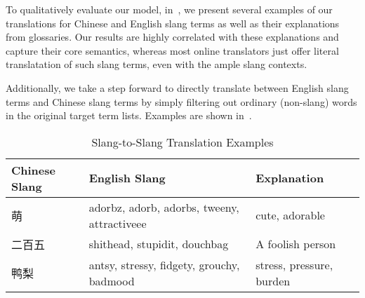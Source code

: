 To qualitatively evaluate our model, in~, 
we present several examples of our translations for Chinese and English slang 
terms as well as their explanations from glossaries.
Our results are highly correlated with these explanations and 
capture their core semantics, whereas most online translators just offer 
literal translatation of such slang terms, even with the ample
slang contexts.

Additionally, we take a step forward to directly translate between 
English slang terms and Chinese slang terms by simply filtering out 
ordinary (non-slang) words in the original target term lists. 
Examples are shown in~. 
\begin{table}[t]
	\scriptsize
	\centering
	\caption{\small{Slang-to-Slang Translation Examples}\vspace{-10pt}}
	\begin{tabular}{C{1.92cm} C{2.5cm} C{2.0cm}}
		\textbf{Chinese Slang} & \textbf{English Slang} & \textbf{Explanation} \\ \hline
		萌 & adorbz, adorb, adorbs, tweeny, attractiveee & cute, adorable \\ \hline
		二百五 & shithead, stupidit, douchbag & A foolish person\\ \hline
		鸭梨 & antsy, stressy, fidgety, grouchy, badmood & stress, pressure, burden \\ \hline
	\end{tabular}
	\label{tab:bleis_4}
\end{table}
